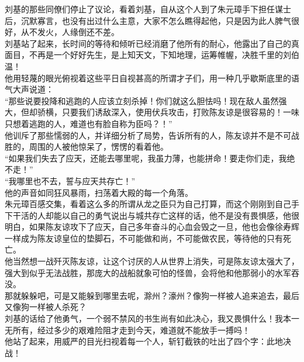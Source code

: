 \begin{multicols}{\theparacolNo}
刘基的那些同僚们停止了议论，看着刘基，自从这个人到了朱元璋手下担任谋士后，沉默寡言，也没有出过什么主意，大家不怎么瞧得起他，只是因为此人脾气很好，从不发火，人缘倒还不差。\\

刘基站了起来，长时间的等待和倾听已经消磨了他所有的耐心，他露出了自己的真面目，不再是一个好好先生，是上知天文，下知地理，运筹帷幄，决胜千里的刘伯温！\\

他用轻蔑的眼光俯视着这些平日自视甚高的所谓才子们，用一种几乎歇斯底里的语气大声说道：\\

“那些说要投降和逃跑的人应该立刻杀掉！你们就这么胆怯吗！现在敌人虽然强大，但却骄横，只要我们诱敌深入，使用伏兵攻击，打败陈友谅是很容易的！一味只想着逃跑的人，难道也有脸自称为臣吗？！”\\

他训斥了那些懦弱的人，并详细分析了局势，告诉所有的人，陈友谅并不是不可战胜的，周围的人被他惊呆了，愣愣的看着他。\\

“如果我们失去了应天，还能去哪里呢，我虽力薄，也能拼命！要走你们走，我绝不走！”\\

“我哪里也不去，誓与应天共存亡！”\\

他的声音如同狂风暴雨，扫荡着大殿的每一个角落。\\

朱元璋百感交集，看着这么多的所谓从龙之臣只为自己打算，而这个刚刚到自己手下干活的人却能以自己的勇气说出与城共存亡这样的话，他不是没有畏惧感，他很明白，如果陈友谅攻下了应天，自己多年奋斗的心血会毁之一旦，他也会像徐寿辉一样成为陈友谅皇位的垫脚石，不可能做和尚，不可能做农民，等待他的只有死亡。\\

他当然想一战歼灭陈友谅，让这个讨厌的人从世界上消失，可是陈友谅太强大了，强大到似乎无法战胜，那庞大的战船就象可怕的怪兽，会将他和他那弱小的水军吞没。\\

那就躲躲吧，可是又能躲到哪里去呢，滁州？濠州？像狗一样被人追来追去，最后又像狗一样被人杀死？\\

刘基的话给了他勇气，一个弱不禁风的书生尚有如此决心，我又畏惧什么！我本一无所有，经过多少的艰难险阻才走到今天，难道就不能放手一搏吗！\\

他站了起来，用威严的目光扫视着每一个人，斩钉截铁的吐出了四个字：此地决战！\\


\end{multicols}
